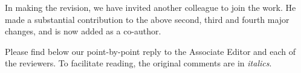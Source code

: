 \documentclass[11pt]{article}
\begin{document}
In making the revision, we have invited another colleague to join the work. He made a substantial contribution to the above second, third and fourth major changes, and is now added as a co-author.

Please find below our point-by-point reply to the Associate Editor and each of the reviewers. To facilitate reading, the original comments are in {\it italics}.


%
%
%
%
%
%
%
%
%
\end{document}
